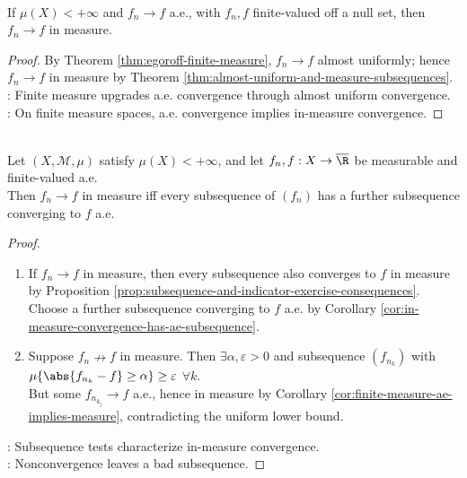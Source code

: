 \begin{corollary} \label{cor:finite-measure-ae-implies-measure} \\
If $\mu(X)<+\infty$ and $f_n\to f$ a.e., with $f_n,f$ finite-valued off a null set, then $f_n\to f$ in measure.
\begin{proof}
By Theorem \ref{thm:egoroff-finite-measure}, $f_n\to f$ almost uniformly; hence $f_n\to f$ in measure by Theorem \ref{thm:almost-uniform-and-measure-subsequences}.\\
: Finite measure upgrades a.e. convergence through almost uniform convergence.\\
: On finite measure spaces, a.e. convergence implies in-measure convergence.
\end{proof}
\end{corollary}

\begin{corollary} \label{cor:finite-measure-subsequence-test-convergence-in-measure} \\
Let $(X,\mathcal{M},\mu)$ satisfy $\mu(X)<+\infty$, and let $f_n,f:X\to\overline{\R}$ be measurable and finite-valued a.e.\\
Then $f_n\to f$ in measure iff every subsequence of $(f_n)$ has a further subsequence converging to $f$ a.e.
\begin{proof}
\begin{enumerate}[label=\roman*.]
\setlength{\itemsep}{0pt}
\item[$(\Rightarrow)$] If $f_n\to f$ in measure, then every subsequence also converges to $f$ in measure by Proposition \ref{prop:subsequence-and-indicator-exercise-consequences}.\\
Choose a further subsequence converging to $f$ a.e. by Corollary \ref{cor:in-measure-convergence-has-ae-subsequence}.
\item[$(\Leftarrow)$] Suppose $f_n\nrightarrow f$ in measure. Then $\exists \alpha,\varepsilon>0$ and subsequence $(f_{n_k})$ with $\mu\{\abs{f_{n_k}-f}\geq\alpha\}\geq\varepsilon$ $\forall k$.\\
But some $f_{n_{k_j}}\to f$ a.e., hence in measure by Corollary \ref{cor:finite-measure-ae-implies-measure}, contradicting the uniform lower bound.
\end{enumerate}
: Subsequence tests characterize in-measure convergence.\\
: Nonconvergence leaves a bad subsequence.
\end{proof}
\end{corollary}

